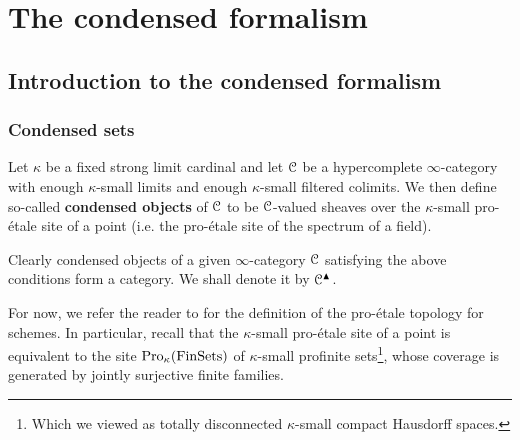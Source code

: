 \section{The condensed formalism} \label{section: condensed_mathematics}
    \subsection{Introduction to the condensed formalism}
        \subsubsection{Condensed sets}
            \begin{definition}[Condensation] \label{def: condensation}
                Let $\kappa$ be a fixed strong limit cardinal and let $\mathcal{C}$ be a hypercomplete $\infty$-category with enough $\kappa$-small limits and enough $\kappa$-small filtered colimits. We then define so-called \textbf{condensed objects} of $\mathcal{C}$ to be $\mathcal{C}$-valued sheaves over the $\kappa$-small pro-\'etale site of a point (i.e. the pro-\'etale site of the spectrum of a field). 
                
                Clearly condensed objects of a given $\infty$-category $\mathcal{C}$ satisfying the above conditions form a category. We shall denote it by $\mathcal{C}^{\blacktriangle}$.
            \end{definition}
            \begin{remark}
                For now, we refer the reader to \cite[Definition 4.1.1 and Remark 4.1.3]{bhatt_scholze_2014_pro_etale} for the definition of the pro-\'etale topology for schemes. In particular, recall that the $\kappa$-small pro-\'etale site of a point is equivalent to the site $\mathrm{Pro}_{\kappa}(\mathrm{Fin}\mathrm{Sets})$ of $\kappa$-small profinite sets\footnote{Which we viewed as totally disconnected $\kappa$-small compact Hausdorff spaces.}, whose coverage is generated by jointly surjective finite families. 
            \end{remark}
